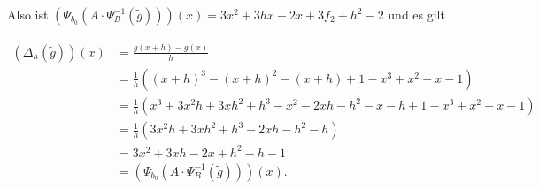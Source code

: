 \documentclass{article}
\begin{document}
Also ist 
$ \left( \Psi_{b_0}(A \cdot \Psi^{-1}_B(\tilde{g})) \right)(x)
=
3x^2 + 3hx - 2x + 3f_2+ h^2 - 2$
und es gilt

\[
\begin{aligned}
    \left( \Delta_h(\tilde{g}) \right)(x)
     &= 
    \frac{\tilde{g}(x + h) - \tilde{g}(x)}{h}
    \\ &= 
    \frac{1}{h}((x + h)^3 - (x + h)^2 - (x + h) + 1 - x^3 + x^2 + x - 1) 
    \\ &= 
    \frac{1}{h}(x^3 + 3x^2h + 3xh^2 + h^3 - x^2 - 2xh - h^2 - x - h + 1 - x^3 + x^2 + x - 1) 
    \\ &= 
    \frac{1}{h}(3x^2h + 3xh^2 + h^3  - 2xh - h^2 - h) 
    \\ &= 
    3x^2 + 3xh - 2x + h^2 - h - 1
    \\ &= 
    \left( \Psi_{b_0}(A \cdot \Psi^{-1}_B(\tilde{g})) \right)(x).
\end{aligned}
\]
\end{document}
